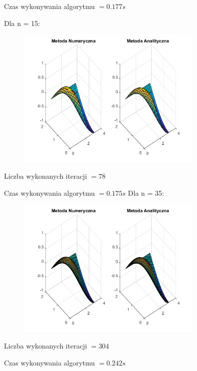 Czas wykonywania algorytmu $ = 0.177 s$

Dla n = 15:

\begin{figure}[!ht]
	\begin{center}
		\includegraphics[width=0.8\textwidth]{Lab6/charts/gs/zad2/15.png}
	\end{center}
\end{figure}

Liczba wykonanych iteracji $ = 78 $

Czas wykonywania algorytmu $ = 0.175 s$
\newpage
Dla n = 35:

\begin{figure}[!ht]
	\begin{center}
		\includegraphics[width=0.8\textwidth]{Lab6/charts/gs/zad2/35.png}
	\end{center}
\end{figure}

Liczba wykonanych iteracji $ = 304 $

Czas wykonywania algorytmu $ = 0.242 s$

